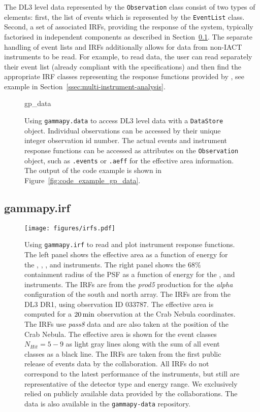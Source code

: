 \documentclass[longauth]{aa}
\newcommand{\code}[1]{\texttt{#1}}
\begin{document}
The DL3 level data represented by the \code{Observation} class consist
of two types of elements: first, the list of \gammaray events 
which is represented by the \code{EventList} class. Second, a set of
associated IRFs, providing the response of the system, typically
factorised in independent components as described in
Section~\ref{ssec:gammapy-irf}. The separate handling of event lists and IRFs
additionally allows for data from non-IACT \gammaray instruments to be read. For
example, to read \fermi data, the user can read separately their event list
(already compliant with the \gadf specifications) and then find the appropriate
IRF classes representing the response functions provided by \fermi, see
example in Section~\ref{ssec:multi-instrument-analysis}.

\begin{figure}
	\small
	{gp_data}
	\caption{
        Using \code{gammapy.data} to access DL3 level data with a \code{DataStore} object.
        Individual observations can be accessed by their unique integer observation id number.
        The actual events and instrument response functions can be accessed
        as attributes on the \code{Observation} object, such as \code{.events}
        or \code{.aeff} for the effective area information. The output
		of the code example is shown in Figure~\ref{fig:code_example_gp_data}.
    }
	\label{fig*:minted:gp_data}
\end{figure}
%

\subsection{gammapy.irf}
\label{ssec:gammapy-irf}
%
%
\begin{figure*}[t]
	\centering
	\texttt{[image: figures/irfs.pdf]}
	\caption{
		Using \code{gammapy.irf} to read and plot instrument response functions.
		The left panel shows the effective area as a function of energy for
		the \cta, \hess, \magic, \hawc and \fermi instruments. The right panel shows
		the $68\%$ containment radius of the PSF as a function of energy for the \cta, \hess
		and \fermi instruments. The \cta IRFs are from the \textit{prod5} production for the {\it alpha} configuration of the south and north array. The \hess IRFs are from the DL3 DR1,
        using observation ID 033787. The \magic effective area is computed for a
        $20\,{\rm min}$ observation at the Crab Nebula coordinates. The
		\fermi IRFs use \textit{pass8} data and are also taken at the position of the Crab Nebula.
		The \hawc effective area is shown for the event classes $N_{Hit}=5 - 9$ as light gray
		lines along with the sum of all event classes as a black line. The \hawc IRFs are taken from
		the first public release of events data by the \hawc collaboration. All IRFs do not correspond
		to the latest performance of the instruments, but still are representative of the 
		detector type and energy range. We exclusively relied on publicly available
		data provided by the collaborations. The data is also available in the
		\code{gammapy-data} repository.
    }
	\label{fig:irfs}
\end{figure*}
%
\end{document}
